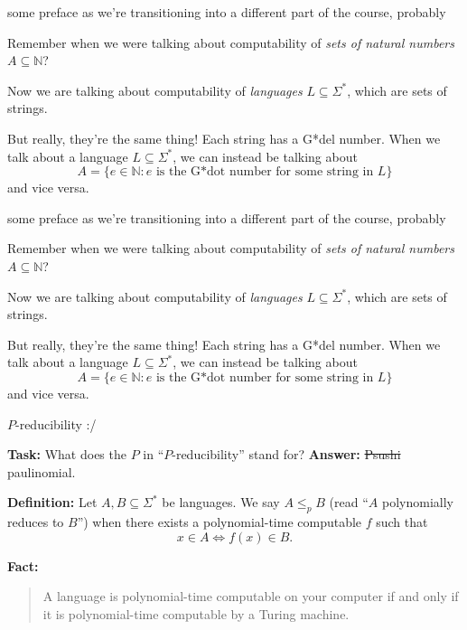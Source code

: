\documentclass{beamer}
\begin{document}
\begin{frame}{some preface as we're transitioning into a different part of the course, probably} 

Remember when we were talking about computability of \textit{sets of natural numbers} $A \subseteq \mathbb N$?

\vspace{2mm}

Now we are talking about computability of \textit{languages} $L \subseteq \Sigma^*$, which are sets of strings. 

\vspace{2mm}

But really, they're the same thing! Each string has a G*del number. When we talk about a language $L \subseteq \Sigma^*$, we can instead be talking about
$$A = \{e \in \mathbb N: \text{$e$ is the G*dot number for some string in $L$}\}$$
and vice versa.

\end{frame}

\begin{frame}{some preface as we're transitioning into a different part of the course, probably} 

Remember when we were talking about computability of \textit{sets of natural numbers} $A \subseteq \mathbb N$?

\vspace{2mm}

Now we are talking about computability of \textit{languages} $L \subseteq \Sigma^*$, which are sets of strings. 

\vspace{2mm}

But really, they're the same thing! Each string has a G*del number. When we talk about a language $L \subseteq \Sigma^*$, we can instead be talking about
$$A = \{e \in \mathbb N: \text{$e$ is the G*dot number for some string in $L$}\}$$
and vice versa.

\end{frame}

\begin{frame}{$P$-reducibility :/} 

\textbf{Task:} What does the $P$ in ``$P$-reducibility'' stand for?
\textbf{Answer:} \sout{Psushi} paulinomial.

\vspace{4mm}

\textbf{Definition:} Let $A, B \subseteq \Sigma^*$ be languages. We say $A \leq_p B$ (read ``$A$ polynomially reduces to $B$'') when there exists a polynomial-time computable $f$ such that
$$x \in A \Leftrightarrow f(x) \in B.$$

\textbf{Fact:}
\begin{quote}
A language is polynomial-time computable on your computer if and only if it is polynomial-time computable by a Turing machine.

\end{quote}
\end{frame}
\end{document}
